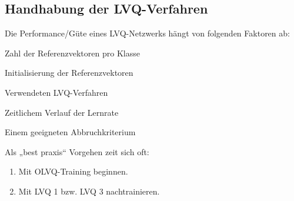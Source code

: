 \subsection{Handhabung der LVQ-Verfahren}
Die Performance/Güte eines LVQ-Netzwerks hängt von folgenden Faktoren ab:
\begin{anumerate}
\item Zahl der Referenzvektoren pro Klasse 
\item Initialisierung der Referenzvektoren
\item Verwendeten LVQ-Verfahren
\item Zeitlichem Verlauf der Lernrate
\item Einem geeigneten Abbruchkriterium
\end{anumerate}

Als „best praxis“ Vorgehen zeit sich oft:
\begin{enumerate}
\item Mit OLVQ-Training beginnen.
\item Mit LVQ 1 bzw. LVQ 3 nachtrainieren.
\end{enumerate}
